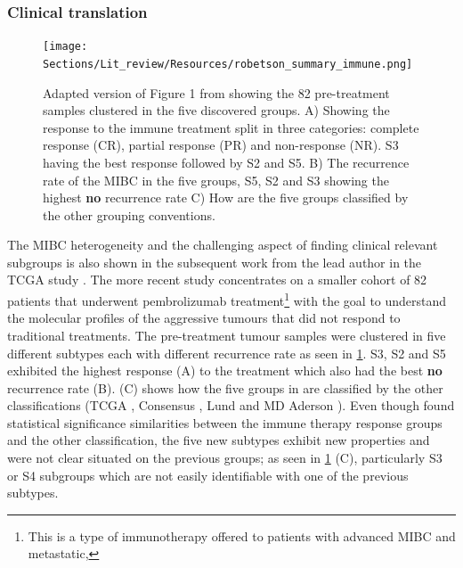 \subsubsection{Clinical translation}


\begin{figure}[!htbp]    
    \centering
\texttt{[image: Sections/Lit\_review/Resources/robetson\_summary\_immune.png]}
    \caption{Adapted version of Figure 1 from \cite{Robertson2023-na} showing the 82 pre-treatment samples clustered in the five discovered groups. A) Showing the response to the immune treatment split in three categories: complete response (CR), partial response (PR) and non-response (NR). S3 having the best response followed by S2 and S5. B) The recurrence rate of the MIBC in the five groups, S5, S2 and S3 showing the highest \textbf{no} recurrence rate C) How are the five groups classified by the other grouping conventions.}
    \label{fig:lit:immune_rob}
\end{figure}


The MIBC heterogeneity and the challenging aspect of finding clinical relevant subgroups is also shown in the subsequent work \citet{Robertson2023-na} from the lead author in the TCGA study \cite{Robertson2017-mg}. The more recent study concentrates on a smaller cohort of 82 patients that underwent pembrolizumab treatment\footnote{This is a type of immunotherapy offered to patients with advanced MIBC and metastatic,} with the goal to understand the molecular profiles of the aggressive tumours that did not respond to traditional treatments. The pre-treatment tumour samples were clustered in five different subtypes each with different recurrence rate as seen in \cref{fig:lit:immune_rob}. S3, S2 and S5 exhibited the highest response (A) to the treatment which also had the best \textbf{no} recurrence rate (B).  (C) shows how the five groups in \cite{Robertson2023-na} are classified by the other classifications (TCGA \cite{Robertson2017-mg}, Consensus \cite{Kamoun2020-tj}, Lund \cite{Marzouka2018-ge} and MD Aderson \cite{Dadhania2016-cb}). Even though \citet{Robertson2023-na} found statistical significance similarities between the immune therapy response groups and the other classification, the five new subtypes exhibit new properties and were not clear situated on the previous groups; as seen in \cref{fig:lit:immune_rob} (C), particularly S3 or S4 subgroups which are not easily identifiable with one of the previous subtypes.

